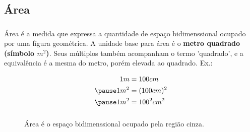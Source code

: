 \documentclass[handout]{beamer}
\begin{document}
\subsection{Área}
\begin{frame}\frametitle{\subsecname}
    Área é a medida que expressa a quantidade de espaço bidimenssional ocupado por uma fígura geométrica. A unidade base
    para área é o \textbf{metro quadrado (símbolo ${m^2}$)}. Seus múltiplos também acompanham o termo 'quadrado',
    e a equivalência é a mesma do metro, porém elevada ao quadrado.
    \pause Ex.:

    \begin{align*}
        1m   & = 100cm     \\
        \pause
        1m^2 & = (100cm)^2 \\
        \pause
        1m^2 & = 100^2cm^2
    \end{align*}

\end{frame}


\begin{frame}\frametitle{\subsecname}

    \begin{figure}[H]
        \centering
        \caption{Área é o espaço bidimenssional ocupado pela região cinza.}
        \label{fig:tri_abc}
    \end{figure}
\end{frame}

\end{document}

